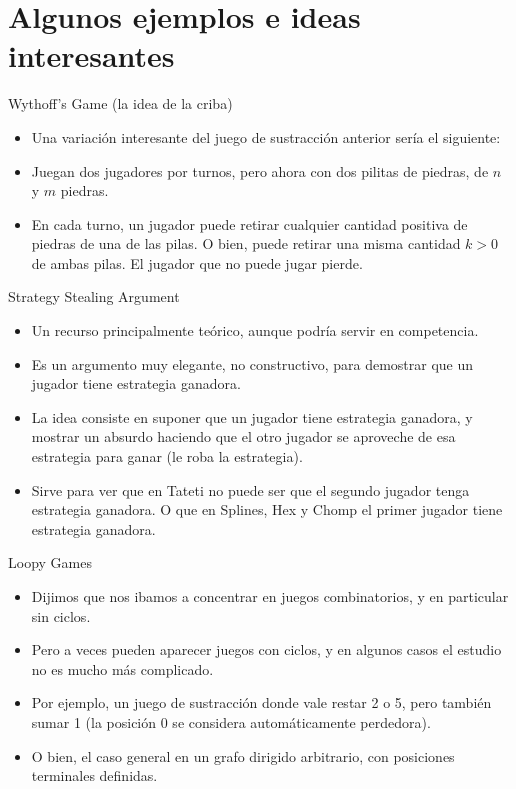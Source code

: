 \documentclass{beamer}
\begin{document}
\section{Algunos ejemplos e ideas interesantes}

\begin{frame}{Wythoff's Game (la idea de la criba)}
    \begin{itemize}
        \item Una variación interesante del juego de sustracción anterior sería el siguiente:
        \item Juegan dos jugadores por turnos, pero ahora con dos pilitas de piedras, de $n$ y $m$ piedras.
        \item En cada turno, un jugador puede retirar cualquier cantidad positiva de piedras de una de las pilas. O bien, puede
        retirar una misma cantidad $k > 0$ de ambas pilas. El jugador que no puede jugar pierde.
    \end{itemize}
\end{frame}

\begin{frame}{Strategy Stealing Argument}
    \begin{itemize}
        \item Un recurso principalmente teórico, aunque podría servir en competencia.
        \item Es un argumento muy elegante, no constructivo, para demostrar que un jugador tiene estrategia ganadora.
        \item La idea consiste en suponer que un jugador tiene estrategia ganadora, y mostrar un absurdo haciendo que el otro jugador
        se aproveche de esa estrategia para ganar (le roba la estrategia).
        \item Sirve para ver que en Tateti no puede ser que el segundo jugador tenga estrategia ganadora. O que en Splines, Hex y Chomp
        el primer jugador tiene estrategia ganadora.
    \end{itemize}
\end{frame}

\begin{frame}{Loopy Games}
    \begin{itemize}
        \item Dijimos que nos ibamos a concentrar en juegos combinatorios, y en particular sin ciclos.
        \item Pero a veces pueden aparecer juegos con ciclos, y en algunos casos el estudio no es mucho más complicado.
        \item Por ejemplo, un juego de sustracción donde vale restar 2 o 5, pero también sumar 1 (la posición 0 se considera automáticamente perdedora).
        
        \item O bien, el caso general en un grafo dirigido arbitrario, con posiciones terminales definidas.
    \end{itemize}
\end{frame}
\end{document}

